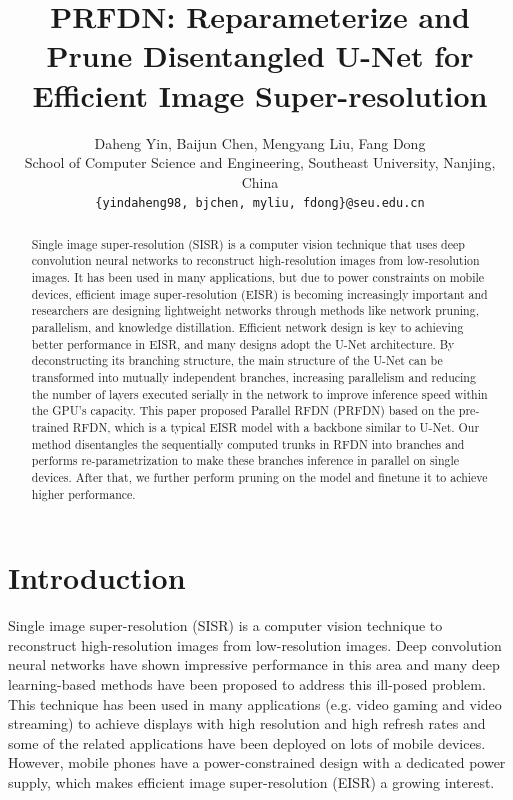 \documentclass[10pt,twocolumn,letterpaper]{article}
\begin{document}
\title{PRFDN: Reparameterize and Prune Disentangled U-Net for Efficient Image Super-resolution}

\author{Daheng Yin, Baijun Chen, Mengyang Liu, Fang Dong\\
School of Computer Science and Engineering, Southeast University, Nanjing, China\\
{\tt\small \{yindaheng98, bjchen, myliu, fdong\}@seu.edu.cn}
}
\maketitle

\begin{abstract}
  Single image super-resolution (SISR) is a computer vision technique that uses deep convolution neural networks to reconstruct high-resolution images from low-resolution images. It has been used in many applications, but due to power constraints on mobile devices, efficient image super-resolution (EISR) is becoming increasingly important and researchers are designing lightweight networks through methods like network pruning, parallelism, and knowledge distillation.
  Efficient network design is key to achieving better performance in EISR, and many designs adopt the U-Net architecture. By deconstructing its branching structure, the main structure of the U-Net can be transformed into mutually independent branches, increasing parallelism and reducing the number of layers executed serially in the network to improve inference speed within the GPU's capacity.
  This paper proposed Parallel RFDN (PRFDN) based on the pre-trained RFDN, which is a typical EISR model with a backbone similar to U-Net. 
  Our method disentangles the sequentially computed trunks in RFDN into branches and performs re-parametrization to make these branches inference in parallel on single devices. 
  After that, we further perform pruning on the model and finetune it to achieve higher performance.
\end{abstract}

\section{Introduction}
\label{sec:intro}

Single image super-resolution (SISR) is a computer vision technique to reconstruct high-resolution images from low-resolution images. Deep convolution neural networks have shown impressive performance in this area and many deep learning-based methods have been proposed to address this ill-posed problem.
This technique has been used in many applications (e.g. video gaming\cite{10.1145/2751496.2751502} and video streaming\cite{kimNeuralEnhancedLiveStreaming2020,yeoNeuralAdaptiveContentaware2018,maoNeuralAdaptiveVideo2017}) to achieve displays with high resolution and high refresh rates and some of the related applications have been deployed on lots of mobile devices\cite{yeoNEMOEnablingNeuralenhanced2020,mehtaEVRNetEfficientVideo2021}.
However, mobile phones have a power-constrained design with a dedicated power supply, which makes efficient image super-resolution (EISR) a growing interest.
\end{document}
